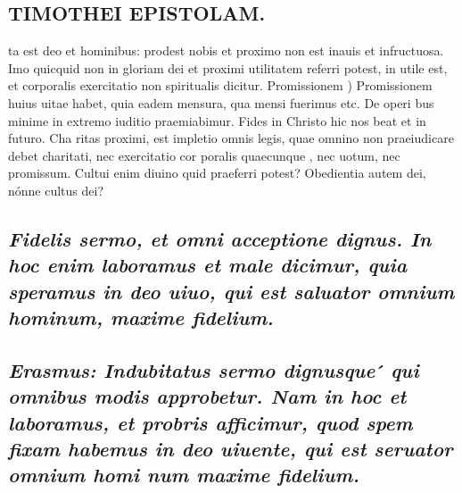 \documentclass{article}
\begin{document}
\begin{pages}
\section*{TIMOTHEI EPISTOLAM. }
\marginpar{[ p.105 ]}\pstart ta est deo et hominibus: prodest nobis et proximo non est inauis et infructuosa. Imo quicquid non in gloriam dei et proximi utilitatem referri potest, in utile est, et corporalis exercitatio non spiritualis dicitur.  \pend\pstart Promissionem ) Promissionem huius uitae habet, quia eadem mensura, qua mensi fuerimus etc. De operi bus minime in extremo iuditio praemiabimur. Fides in Christo hic nos beat et in futuro. Cha ritas proximi, est impletio omnis legis, quae omnino non praeiudicare debet charitati, nec exercitatio cor poralis quaecunque , nec uotum, nec promissum. Cultui enim diuino quid praeferri potest? Obedientia autem dei, nónne cultus dei?  \pend
{}
{}
\subsection*{\textit{Fidelis sermo, et omni acceptione dignus. In hoc enim laboramus et male dicimur, quia speramus in deo uiuo, qui est saluator omnium hominum, maxime fidelium. }}
{}
\subsection*{\textit{Erasmus: Indubitatus sermo dignusque ́ qui omnibus modis approbetur. Nam in hoc et laboramus, et probris afficimur, quod spem fixam habemus in deo uiuente, qui est seruator omnium homi num maxime fidelium. }}

\end{pages}
\end{document}
